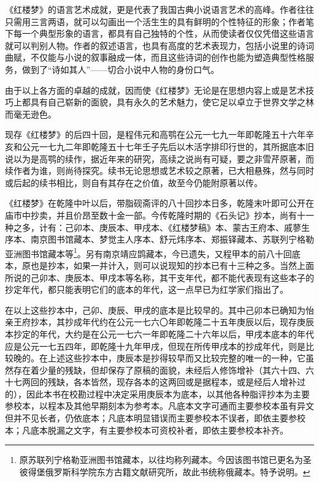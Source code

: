 \par 《红楼梦》的语言艺术成就，更是代表了我国古典小说语言艺术的高峰。作者往往只需用三言两语，就可以勾画出一个活生生的具有鲜明的个性特征的形象；作者笔下每一个典型形象的语言，都具有自己独特的个性，从而使读者仅仅凭借这些语言就可以判别人物。作者的叙述语言，也具有高度的艺术表现力，包括小说里的诗词曲赋，不仅能与小说的叙事融成一体，而且这些诗词的创作也能为塑造典型性格服务，做到了“诗如其人”——切合小说中人物的身份口气。
\par 由于以上各方面的卓越的成就，因而使《红楼梦》无论是在思想内容上或是艺术技巧上都具有自己崭新的面貌，具有永久的艺术魅力，使它足以卓立于世界文学之林而毫无逊色。
\par 现存《红楼梦》的后四十回，是程伟元和高鹗在公元一七九一年即乾隆五十六年辛亥和公元一七九二年即乾隆五十七年壬子先后以木活字排印行世的，其所据底本旧说以为是高鹗的续作，据近年来的研究，高续之说尚有可疑，要之非雪芹原著，而续作者为谁，则尚待探究。续书无论思想或艺术较之原著，已大相悬殊，然与同时或后起的续书相比，则自有其存在之价值，故至今仍能附原著以传。
\par 《红楼梦》在乾隆中叶以后，带脂砚斋评的八十回抄本日多，乾隆末叶即可公开在庙市中抄卖，并且价昂至数十金一部。今传乾隆时期的《石头记》抄本，尚有十一种之多，计有：己卯本、庚辰本、甲戌本、《红楼梦稿》本、蒙古王府本、戚蓼生序本、南京图书馆藏本、梦觉主人序本、舒元炜序本、郑振铎藏本、苏联列宁格勒亚洲图书馆藏本等\footnote{原苏联列宁格勒亚洲图书馆藏本，以往均称列藏本。今因该图书馆已更名为圣彼得堡俄罗斯科学院东方古籍文献研究所，故此书统称俄藏本。特予说明。}。另有南京靖应鹍藏本，今已遗失，又程甲本的前八十回底本，原也是抄本，如果一并计入，则可以说现知的抄本已有十三种之多。当然上面所说的己卯本、庚辰本、甲戌本等名称，其干支年代，都不能代表现有这些本子的抄定年代，都只能表明它们的底本的年代，这一点早已为红学家们指出了。
\par 在以上这些抄本中，己卯、庚辰、甲戌的底本是比较早的。其中己卯本已确知为怡亲王府抄本，其抄成年代约在公元一七六〇年即乾隆二十五年庚辰以后，现存庚辰本抄定的年代，大约是在公元一七六一年即乾隆二十六年以后，甲戌本底本的年代应是公元一七五四年，即乾隆十九年甲戌，但现在所传甲戌本的抄成年代，则是比较晚的。在上述这些抄本中，庚辰本是抄得较早而又比较完整的唯一的一种，它虽然存在着少量的残缺，但却保存了原稿的面貌，未经后人修饰增补（其六十四、六十七两回的残缺，各本皆然，现存各本的这两回或是据程本，或是经后人增补过的），因此本书在校勘过程中决定采用庚辰本为底本，以其他各种脂评抄本为主要参校本，以程本及其他早期刻本为参考本。凡底本文字可通而主要参校本虽有异文但并不见长者，仍依底本；凡底本明显错误而主要参校本不误者，即依主要参校本；凡底本脱漏之文字，有主要参校本可资校补者，即依主要参校本补齐。
